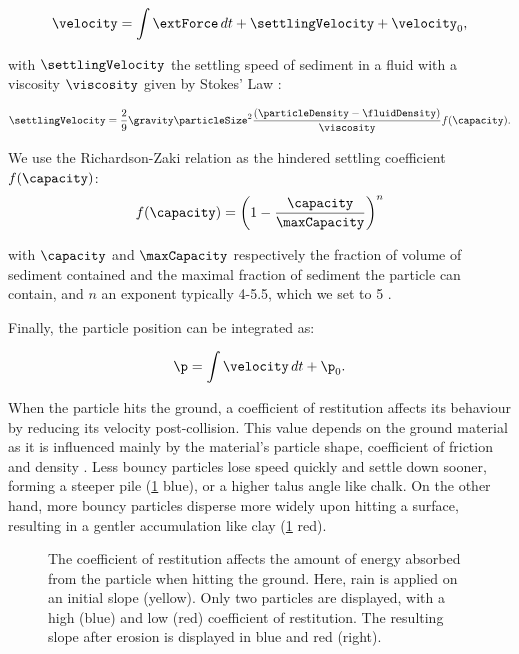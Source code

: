 \begin{align}
    \label{eq:erosion-velocity-computation}
    \velocity = \int{ \extForce \, dt} + \settlingVelocity + \velocity_0,
\end{align}

with $\settlingVelocity$ the settling speed of sediment in a fluid with a viscosity $\viscosity$ given by Stokes' Law \cite{Stokes1850}: 

\begin{align} 
    \label{eq:erosion-initialSettlingVelocity}
    \settlingVelocity = \frac{ 2 }{ 9 }  \gravity \particleSize^2 \frac{(\particleDensity - \fluidDensity)}{\viscosity } f(\capacity).
\end{align} 

We use the Richardson-Zaki relation as the hindered settling coefficient $f(\capacity)$: 
\begin{align}
    \label{eq:erosion-Richardson}
    f(\capacity) = \left( 1 - \frac{\capacity}{ \maxCapacity } \right)^{n}
\end{align}

with $\capacity$ and $\maxCapacity$ respectively the fraction of volume of sediment contained and the maximal fraction of sediment the particle can contain, and $n$ an exponent typically 4-5.5, which we set to 5 \cite{Richardson1954, Wojtan2007}.

Finally, the particle position can be integrated as: 

\begin{align*}
    \p = \int{ \velocity \, dt} + \p_0.
\end{align*}

When the particle hits the ground, a coefficient of restitution affects its behaviour by reducing its velocity post-collision. This value depends on the ground material as it is influenced mainly by the material's particle shape, coefficient of friction and density \cite{Yan2020}. Less bouncy particles lose speed quickly and settle down sooner, forming a steeper pile (\cref{fig:erosion-coefficient of restitution-diagram} blue), or a higher talus angle like chalk. On the other hand, more bouncy particles disperse more widely upon hitting a surface, resulting in a gentler accumulation like clay (\cref{fig:erosion-coefficient of restitution-diagram} red).


\begin{figure}
    \centering
    \caption{The coefficient of restitution affects the amount of energy absorbed from the particle when hitting the ground. Here, rain is applied on an initial slope (yellow). Only two particles are displayed, with a high (blue) and low (red) coefficient of restitution. The resulting slope after erosion is displayed in blue and red (right).}
    \label{fig:erosion-coefficient of restitution-diagram}
\end{figure}


